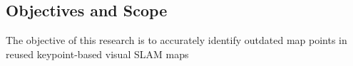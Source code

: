 \subsection{Objectives and Scope}
\label{objectives}

The objective of this research is to accurately identify outdated map points in reused keypoint-based visual SLAM maps